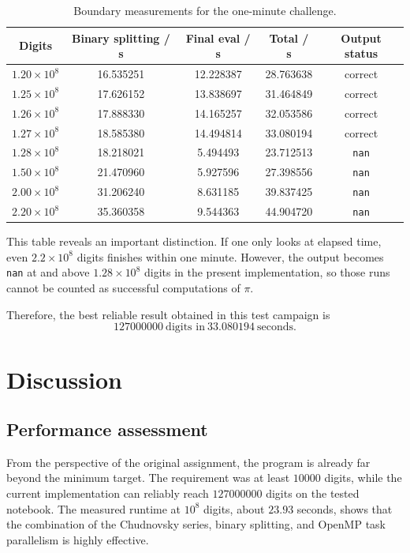 \documentclass[12pt,a4paper]{article}
\begin{document}
\begin{table}[H]
\centering
\caption{Boundary measurements for the one-minute challenge.}
\label{tab:limit}
\begin{tabular}{ccccc}
\toprule
Digits & Binary splitting / s & Final eval / s & Total / s & Output status \\
\midrule
$1.20\times 10^8$ & 16.535251 & 12.228387 & 28.763638 & correct \\
$1.25\times 10^8$ & 17.626152 & 13.838697 & 31.464849 & correct \\
$1.26\times 10^8$ & 17.888330 & 14.165257 & 32.053586 & correct \\
$1.27\times 10^8$ & 18.585380 & 14.494814 & 33.080194 & correct \\
$1.28\times 10^8$ & 18.218021 & 5.494493 & 23.712513 & \texttt{nan} \\
$1.50\times 10^8$ & 21.470960 & 5.927596 & 27.398556 & \texttt{nan} \\
$2.00\times 10^8$ & 31.206240 & 8.631185 & 39.837425 & \texttt{nan} \\
$2.20\times 10^8$ & 35.360358 & 9.544363 & 44.904720 & \texttt{nan} \\
\bottomrule
\end{tabular}
\end{table}

This table reveals an important distinction. If one only looks at elapsed time, even $2.2\times 10^8$ digits finishes within one minute. However, the output becomes \texttt{nan} at and above $1.28\times 10^8$ digits in the present implementation, so those runs cannot be counted as successful computations of $\pi$.

Therefore, the best reliable result obtained in this test campaign is
\[
\boxed{127000000\ \text{digits in}\ 33.080194\ \text{seconds}.}
\]

\section{Discussion}

\subsection{Performance assessment}

From the perspective of the original assignment, the program is already far beyond the minimum target. The requirement was at least $10000$ digits, while the current implementation can reliably reach $127000000$ digits on the tested notebook. The measured runtime at $10^8$ digits, about $23.93$ seconds, shows that the combination of the Chudnovsky series, binary splitting, and OpenMP task parallelism is highly effective.
\end{document}
